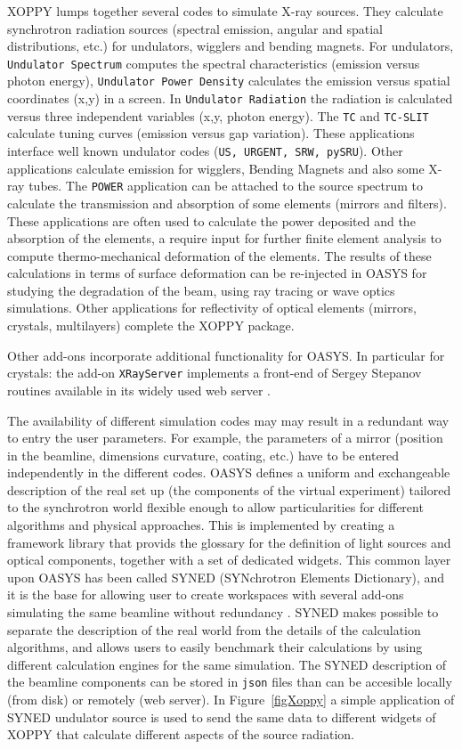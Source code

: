 \documentclass{aip-cp}
\begin{document}
XOPPY lumps together several codes to simulate X-ray sources. They calculate synchrotron radiation sources (spectral emission, angular and spatial distributions, etc.) for undulators, wigglers and bending magnets. For undulators, {\tt Undulator Spectrum} computes the spectral characteristics (emission versus photon energy),  {\tt Undulator Power Density} calculates the emission versus spatial coordinates (x,y) in a screen. In {\tt Undulator Radiation} the radiation is calculated versus three independent variables (x,y, photon energy). The {\tt TC} and {\tt TC-SLIT} calculate tuning curves (emission versus gap variation). These applications interface well known undulator codes ({\tt US, URGENT\cite{urgent}, SRW\cite{srw}, pySRU}). Other applications calculate emission for wigglers, Bending Magnets and also some X-ray tubes. The {\tt POWER} application can be attached to the source spectrum to calculate the transmission and absorption of some elements (mirrors and filters). These applications are often used to calculate the power deposited and the absorption of the elements, a require input for further finite element analysis to compute thermo-mechanical deformation of the elements. The results of these calculations in terms of surface deformation can be re-injected in OASYS for studying the degradation of the beam, using ray tracing or wave optics simulations. Other applications for reflectivity of optical elements (mirrors, crystals, multilayers) complete the XOPPY package. 

Other add-ons incorporate additional functionality for OASYS. In particular for crystals: the add-on {\tt XRayServer} implements a front-end of Sergey Stepanov routines available in its widely used web server \cite{xrayserver}.  

The availability of different simulation codes may may result in a redundant way to entry the user parameters. For example, the parameters of a mirror (position in the beamline, dimensions curvature, coating, etc.) have to be entered independently in the different codes. 
OASYS defines a uniform and exchangeable description of the real set up (the components of the virtual experiment) tailored to the synchrotron world  flexible enough to allow particularities for different algorithms and physical approaches. This is implemented by creating a framework library that provids the glossary for the definition of light sources and optical components, together with a set of dedicated widgets. This common layer upon OASYS has been called SYNED (SYNchrotron Elements Dictionary), and it is the base for allowing user to create workspaces with several add-ons simulating the same beamline without redundancy \cite{oasys2}. SYNED makes possible to  separate the description of the real world from the details of the calculation algorithms, and allows users to easily benchmark their calculations by using different calculation engines for the same simulation. The SYNED description of the beamline components can be stored in {\tt json} files than can be accesible locally (from disk) or remotely (web server). In Figure~\ref{figXoppy} a simple application of SYNED undulator source is used to send the same data to different widgets of XOPPY that calculate different aspects of the source radiation. 
\end{document}
